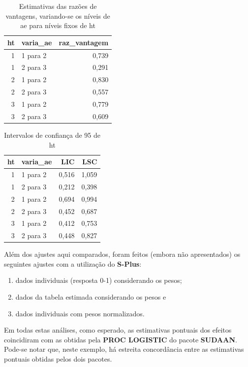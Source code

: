 \documentclass[]{book}
\theoremstyle{definition}
\theoremstyle{definition}
\theoremstyle{definition}
\theoremstyle{remark}
\begin{document}
\begin{table}

\caption{\label{tab:razvant}Estimativas das razões de vantagens, variando-se os níveis de ae para níveis fixos
  de ht}
\centering
\begin{tabular}[t]{rlr}
\toprule
ht & varia\_ae & raz\_vantagem\\
\midrule
1 & 1 para 2 & 0,739\\
1 & 2 para 3 & 0,291\\
2 & 1 para 2 & 0,830\\
2 & 2 para 3 & 0,557\\
3 & 1 para 2 & 0,779\\
3 & 2 para 3 & 0,609\\
\bottomrule
\end{tabular}
\end{table}

\begin{table}

\caption{\label{tab:icvant}Intervalos de confiança de 95%
  de ht}
\centering
\begin{tabular}[t]{rlrr}
\toprule
ht & varia\_ae & LIC & LSC\\
\midrule
1 & 1 para 2 & 0,516 & 1,059\\
1 & 2 para 3 & 0,212 & 0,398\\
2 & 1 para 2 & 0,694 & 0,994\\
2 & 2 para 3 & 0,452 & 0,687\\
3 & 1 para 2 & 0,412 & 0,753\\
3 & 2 para 3 & 0,448 & 0,827\\
\bottomrule
\end{tabular}
\end{table}

Além dos ajustes aqui comparados, foram feitos (embora não apresentados)
os seguintes ajustes com a utilização do \textbf{S-Plus}:

\begin{enumerate}
\def\labelenumi{\arabic{enumi})}
\item
  dados individuais (resposta 0-1) considerando os pesos;
\item
  dados da tabela estimada considerando os pesos e
\item
  dados individuais com pesos normalizados.
\end{enumerate}

Em todas estas análises, como esperado, as estimativas pontuais dos
efeitos coincidiram com as obtidas pela \textbf{PROC LOGISTIC} do pacote
\textbf{SUDAAN}. Pode-se notar que, neste exemplo, há estreita
concordância entre as estimativas pontuais obtidas pelos dois pacotes.
\end{document}

